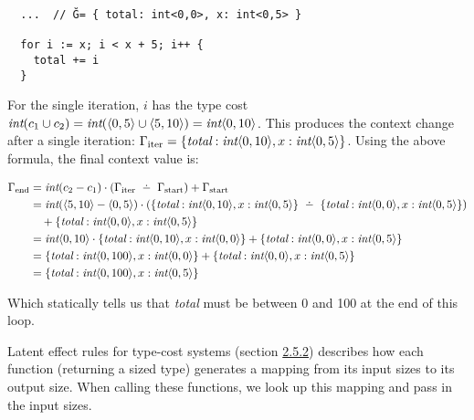 \begin{verbatim}
  ...  // Ğ= { total: int<0,0>, x: int<0,5> }

  for i := x; i < x + 5; i++ { 
    total += i
  }
\end{verbatim}

For the single iteration, \( i \) has the type cost \( \textit{int}(c_1 \cup c_2) = \textit{int}(\langle{0, 5}\rangle \cup \langle{5, 10}\rangle) = \textit{int}\langle{0, 10}\rangle \). This produces the context change after a single iteration: \( \Gamma_\text{iter} = \{ \textit{total}: \textit{int}\langle{0, 10}\rangle, x: \textit{int}\langle{0, 5}\rangle \} \). Using the above formula, the final context value is:

\begin{align*}
  \Gamma_\text{end} & = \textit{int}(c_2 - c_1) \cdot (\Gamma_\text{iter} \dotminus \Gamma_\text{start}) + \Gamma_\text{start}                                                                                                                \\
                    & = \textit{int}(\bound{5}{10} - \bound{0}{5}) \cdot (\{ \textit{total}: \textit{int}\bound{0}{10}, x: \textit{int}\bound{0}{5} \} \dotminus \{ \textit{total}: \textit{int}\bound{0}{0}, x: \textit{int}\bound{0}{5} \}) \\
                    & \ \ \ + \{ \textit{total}: \textit{int}\bound{0}{0}, x: \textit{int}\bound{0}{5} \}                                                                                                                                     \\
                    & = \textit{int}\bound{0}{10} \cdot \{ \textit{total}: \textit{int}\bound{0}{10}, x: \textit{int}\bound{0}{0} \} + \{ \textit{total}: \textit{int}\bound{0}{0}, x: \textit{int}\bound{0}{5} \}                            \\
                    & = \{ \textit{total}: \textit{int}\bound{0}{100}, x: \textit{int}\bound{0}{0} \} + \{ \textit{total}: \textit{int}\bound{0}{0}, x: \textit{int}\bound{0}{5} \}                                                           \\
                    & = \{ \textit{total}: \textit{int}\bound{0}{100}, x: \textit{int}\bound{0}{5} \}
\end{align*}

Which statically tells us that \textit{total} must be between 0 and 100 at the end of this loop.

Latent effect rules for type-cost systems (section \hyperref[sec:2.5.2]{2.5.2}) describes how each function (returning a sized type) generates a mapping from its input sizes to its output size. When calling these functions, we look up this mapping and pass in the input sizes.

